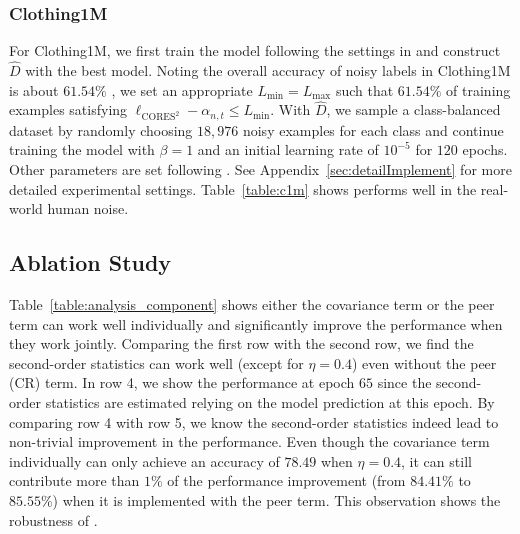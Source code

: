 \documentclass[final]{cvpr}
\newcommand{\estD}{{\hat D}}
\newcommand{\covpeer}{\text{CAL}}
\begin{document}
\subsubsection{Clothing1M}
For Clothing1M, we first train the model following the settings in \cite{sieve2020} and construct $\estD$ with the best model.
Noting the overall accuracy of noisy labels in Clothing1M is about $61.54\%$ \cite{xiao2015learning}, we set an appropriate $L_{\min} = L_{\max}$ such that $61.54\%$ of training examples satisfying $\ell_{\text{CORES}^2}-\alpha_{n,t} \le L_{\min}$.
With $\estD$, we sample a class-balanced dataset by randomly choosing $18,976$ noisy examples for each class and continue training the model with $\beta = 1$ and an initial learning rate of $10^{-5}$ for $120$ epochs.
Other parameters are set following \cite{sieve2020}.
See Appendix~\ref{sec:detailImplement} for more detailed experimental settings.
Table~\ref{table:c1m} shows \covpeer{} performs well in the real-world human noise.


\subsection{Ablation Study}

Table~\ref{table:analysis_component} shows either the covariance term or the peer term can work well individually and significantly improve the performance when they work jointly.
Comparing the first row with the second row, we find the second-order statistics can work well (except for $\eta=0.4$) even without the peer (CR) term. 
In row 4, we show the performance at epoch $65$ since the second-order statistics are estimated relying on the model prediction at this epoch.
By comparing row 4 with row 5, we know the second-order statistics indeed lead to non-trivial improvement in the performance.
Even though the covariance term individually can only achieve an accuracy of $78.49$ when $\eta=0.4$, it can still contribute more than $1\%$ of the performance improvement (from $84.41\%$ to $85.55\%$) when it is implemented with the peer term.
This observation shows the robustness of \covpeer{}.
\end{document}
